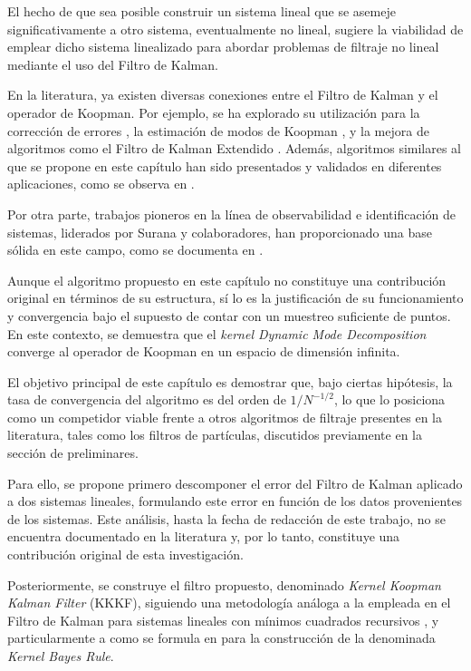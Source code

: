 El hecho de que sea posible construir un sistema lineal que se asemeje significativamente a otro sistema, eventualmente no lineal, sugiere la viabilidad de emplear dicho sistema linealizado para abordar problemas de filtraje no lineal mediante el uso del Filtro de Kalman. 

En la literatura, ya existen diversas conexiones entre el Filtro de Kalman y el operador de Koopman. Por ejemplo, se ha explorado su utilización para la corrección de errores \cite{Jiang2022CorrectingFilters}, la estimación de modos de Koopman \cite{Liu2024EstimateFilter}, y la mejora de algoritmos como el Filtro de Kalman Extendido \cite{Ramadan2024ExtendedControl}. Además, algoritmos similares al que se propone en este capítulo han sido presentados y validados en diferentes aplicaciones, como se observa en \cite{Wang2022KoopmanSystem, Wang2023Innovation-saturatedOutliers, Netto2018RobustEstimation, Syed2021Koopman-basedXFEL, HuangData-DrivenFlight}. 

Por otra parte, trabajos pioneros en la línea de observabilidad e identificación de sistemas, liderados por Surana y colaboradores, han proporcionado una base sólida en este campo, como se documenta en \cite{Surana2016KoopmanSystems, Surana2016LinearFramework}.

Aunque el algoritmo propuesto en este capítulo no constituye una contribución original en términos de su estructura, sí lo es la justificación de su funcionamiento y convergencia bajo el supuesto de contar con un muestreo suficiente de puntos. En este contexto, se demuestra que el \textit{kernel Dynamic Mode Decomposition} converge al operador de Koopman en un espacio de dimensión infinita. 

El objetivo principal de este capítulo es demostrar que, bajo ciertas hipótesis, la tasa de convergencia del algoritmo es del orden de $1/N^{-1/2}$, lo que lo posiciona como un competidor viable frente a otros algoritmos de filtraje presentes en la literatura, tales como los filtros de partículas, discutidos previamente en la sección de preliminares.

Para ello, se propone primero descomponer el error del Filtro de Kalman aplicado a dos sistemas lineales, formulando este error en función de los datos provenientes de los sistemas. Este análisis, hasta la fecha de redacción de este trabajo, no se encuentra documentado en la literatura y, por lo tanto, constituye una contribución original de esta investigación.

Posteriormente, se construye el filtro propuesto, denominado \textit{Kernel Koopman Kalman Filter} (KKKF), siguiendo una metodología análoga a la empleada en el Filtro de Kalman para sistemas lineales con mínimos cuadrados recursivos \cite{Kalman1960AProblems, Triantafyllopoulos2021BayesianBeyond}, y particularmente a como se formula en \cite{Gebhard2019} para la construcción de la denominada \textit{Kernel Bayes Rule}.

